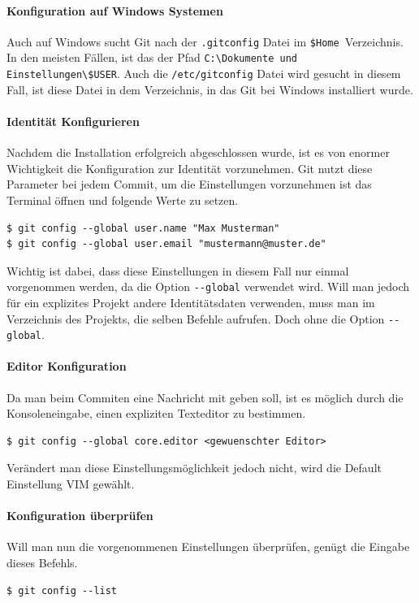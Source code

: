 \documentclass[12pt,a4paper,bibliography=totocnumbered,listof=totocnumbered]{scrartcl}
\begin{document}
\paragraph{Konfiguration auf Windows Systemen}
Auch auf Windows sucht Git nach der \lstinline|.gitconfig| Datei im  \lstinline|$Home |Verzeichnis.  In den meisten Fällen, ist das 
der Pfad \lstinline|C:\Dokumente und Einstellungen\$USER|. Auch die \lstinline|/etc/gitconfig| Datei wird gesucht in diesem Fall, ist diese Datei in dem Verzeichnis, in das Git bei Windows installiert wurde.

\paragraph{Identität Konfigurieren}
Nachdem die Installation erfolgreich abgeschlossen wurde, ist es von enormer Wichtigkeit die Konfiguration zur Identität vorzunehmen. Git nutzt diese Parameter bei jedem Commit,
um die Einstellungen vorzunehmen ist das Terminal öffnen und folgende Werte zu setzen.

\begin{lstlisting}
$ git config --global user.name "Max Musterman"
$ git config --global user.email "mustermann@muster.de"
\end{lstlisting}

Wichtig ist dabei, dass diese Einstellungen in diesem Fall nur einmal vorgenommen werden, da die Option \lstinline|--global| verwendet wird. Will man jedoch für ein explizites Projekt andere Identitätsdaten verwenden, muss man im Verzeichnis des Projekts, die selben Befehle aufrufen. Doch ohne die Option \lstinline|--global|.
\paragraph{Editor Konfiguration}
Da man beim Commiten eine Nachricht mit geben soll,  ist es möglich durch die Konsoleneingabe,  einen expliziten Texteditor zu bestimmen.
\begin{lstlisting}
$ git config --global core.editor <gewuenschter Editor>
\end{lstlisting}
Verändert man diese Einstellungsmöglichkeit jedoch nicht, wird die Default Einstellung VIM gewählt.

\paragraph{Konfiguration überprüfen}
Will man nun die vorgenommenen Einstellungen überprüfen, genügt die Eingabe dieses Befehls.
\begin{lstlisting}
$ git config --list
\end{lstlisting}
\end{document}
